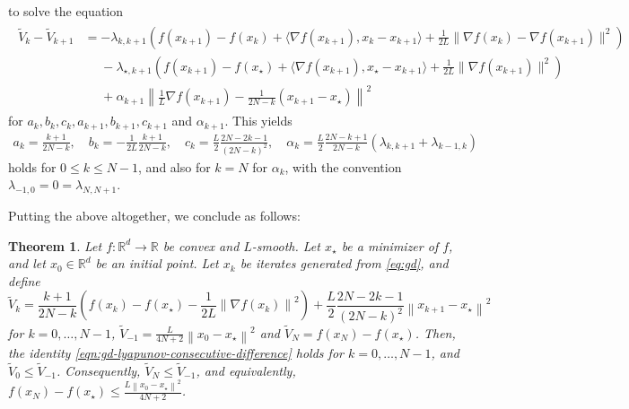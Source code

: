 \documentclass{article}
\theoremstyle{definition}
\theoremstyle{plain}
\newtheorem{theorem}{Theorem}
\newcommand{\reals}{\mathbb{R}}
\newcommand{\sqnorm}[1]{\left\| #1 \right\|^2}
\newcommand{\norm}[1]{\left\|#1\right\|}
\newcommand{\pr}[1]{\left( #1 \right)}
\begin{document}
to solve the equation
\begin{align}
    \label{eqn:gd-lyapunov-consecutive-difference}
    \begin{aligned}
        \widetilde{V}_k - \widetilde{V}_{k+1} & = -\lambda_{k,k+1} \left( f(x_{k+1})-f(x_k) + \langle \nabla f(x_{k+1}) , x_{k} - x_{k+1} \rangle + \frac{1}{2 L} \| \nabla f(x_{k}) - \nabla f(x_{k+1}) \|^2 \right)  \\ 
        & \phantom{=} - \lambda_{\star,k+1} \left( f(x_{k+1})-f(x_{\star}) + \langle \nabla f(x_{k+1}) , x_{\star} - x_{k+1} \rangle + \frac{1}{2 L} \| \nabla f(x_{k+1}) \|^2 \right) \\ 
        &\phantom{=} + \alpha_{k+1} \sqnorm{\frac{1}{L}\nabla f(x_{k+1}) - \frac{1}{2N-k} (x_{k+1} - x_\star)} 
    \end{aligned}
\end{align}
for $a_k, b_k, c_k, a_{k+1}, b_{k+1}, c_{k+1}$ and $\alpha_{k+1}$.
This yields
\begin{align*}
    a_k = \frac{k+1}{2N-k} , \quad b_k = -\frac{1}{2L} \frac{k+1}{2N-k} , \quad c_k = \frac{L}{2} \frac{2N-2k-1}{(2N-k)^2} , \quad \alpha_k = \frac{L}{2} \frac{2N-k+1}{2N - k} \pr{ \lambda_{k,k+1} + \lambda_{k-1,k} } 
\end{align*}
holds for $0 \le k \le N-1$, and also for $k=N$ for $\alpha_k$, with the convention $\lambda_{-1,0} = 0 = \lambda_{N,N+1}$.


Putting the above altogether, we conclude as follows:
\begin{theorem} \label{theorem:gd}
    Let $f\colon \reals^d \to \reals$ be convex and $L$-smooth. Let $x_\star$ be a minimizer of $f$, and let $x_0 \in \reals^d$ be an initial point.
    Let $x_k$ be iterates generated from \eqref{eq:gd}, and define
    \begin{equation*}
        \widetilde{V}_k = 
            \frac{k+1}{2N-k} \pr{ f(x_k) - f(x_\star) - \frac{1}{2L} \norm{ \nabla f(x_k) }^2 }
            + \frac{L}{2} \frac{2N-2k-1}{(2N-k)^2} \norm{ x_{k+1} - x_\star }^2 
    \end{equation*}
    for $k=0,\dots,N-1$, $\widetilde{V}_{-1} =  \frac{L}{4N+2} \norm{ x_{0} - x_\star }^2$ and $\widetilde{V}_N =  f(x_N) - f(x_\star)$. 
    Then, the identity \eqref{eqn:gd-lyapunov-consecutive-difference} holds for $k=0,\dots,N-1$, and $\widetilde{V}_0 \le \widetilde{V}_{-1}$.
    Consequently, $\widetilde{V}_N \le \widetilde{V}_{-1}$, and equivalently, $f(x_N) - f(x_\star) \le \frac{L\sqnorm{x_0 - x_\star}}{4N+2}$.
\end{theorem}
\end{document}

